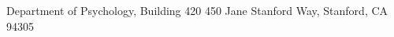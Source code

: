 \address{Stanford University}{Department of Psychology, Building 420}%
    {450 Jane Stanford Way, Stanford, CA 94305}
